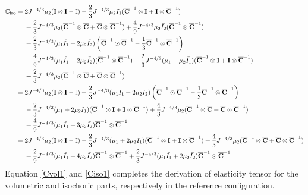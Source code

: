 \begin{equation} \label{Ciso1}
\begin{split}
\mathbb{C}_\mathrm{iso} 
= {} & 
2{J}^{-4/3}\mu_2(\bold{I} \otimes \bold{I} - \mathbb{I}) - \frac{2}{3}J^{-4/3}\mu_2\bar{I_1}({\overline{\bold{C}}}^{-1} \otimes \bold{I} + \bold{I} \otimes {\overline{\bold{C}}}^{-1}) \\
&+
\frac{2}{3}J^{-4/3}\mu_2({\overline{\bold{C}}}^{-1} \otimes {\overline{\bold{C}}} + {\overline{\bold{C}}} \otimes {\overline{\bold{C}}}^{-1}) + \frac{4}{9}J^{-4/3}\mu_2\bar{I_2}({\overline{\bold{C}}}^{-1} \otimes {\overline{\bold{C}}}^{-1}) \\
&+
\frac{2}{3}J^{-4/3}(\mu_1\bar{I_1} + 2\mu_2\bar{I_2}) \left ({\overline{\bold{C}}}^{-1} \odot {{\overline{\bold{C}}}}^{-1} - \frac{1}{3}{{\overline{\bold{C}}}}^{-1} \otimes {\overline{{\bold{C}}}}^{-1} \right) \\
&+
\frac{4}{9}J^{-4/3} (\mu_1\bar{I_1} + 2\mu_2\bar{I_2})({\overline{\bold{C}}}^{-1} \otimes {\overline{\bold{C}}}^{-1}) - \frac{2}{3}J^{-4/3}(\mu_1+\mu_2\bar{I_1})({\overline{\bold{C}}}^{-1} \otimes \bold{I} + \bold{I} \otimes {\overline{\bold{C}}}^{-1})\\
&+ \frac{2}{3}J^{-4/3}\mu_2({\overline{\bold{C}}}^{-1} \otimes {\overline{\bold{C}}}+{\overline{\bold{C}}} \otimes {\overline{\bold{C}}}^{-1})  \\
= {} &
2{J}^{-4/3}\mu_2(\bold{I} \otimes \bold{I} - \mathbb{I}) + \frac{2}{3}J^{-4/3}(\mu_1\bar{I_1} + 2\mu_2\bar{I_2})\left({\overline{\bold{C}}}^{-1} \odot {\overline{\bold{C}}}^{-1} - \frac{1}{3}{\overline{\bold{C}}}^{-1} \otimes {\overline{\bold{C}}}^{-1}\right) \\
&-
\frac{2}{3}J^{-4/3}(\mu_1 + 2\mu_2\bar{I_1})({\overline{\bold{C}}}^{-1} \otimes \bold{I} + \bold{I} \otimes {\overline{\bold{C}}}^{-1}) + \frac{4}{3}J^{-4/3}\mu_2({\overline{\bold{C}}}^{-1} \otimes {\overline{\bold{C}}} + {\overline{\bold{C}}} \otimes {\overline{\bold{C}}}^{-1}) \\
&+
\frac{4}{9}J^{-4/3}(\mu_1\bar{I_1} + 3\mu_2\bar{I_2}){\overline{\bold{C}}}^{-1} \otimes {\overline{\bold{C}}}^{-1} \\
= {} &
2{J}^{-4/3}\mu_2(\bold{I} \otimes \bold{I} - \mathbb{I}) - \frac{2}{3}J^{-4/3}(\mu_1 + 2\mu_2\bar{I_1})({\overline{\bold{C}}}^{-1} \otimes \bold{I} + \bold{I} \otimes {\overline{\bold{C}}}^{-1}) + \frac{4}{3}J^{-4/3}\mu_2({\overline{\bold{C}}}^{-1} \otimes {\overline{\bold{C}}} + {\overline{\bold{C}}} \otimes {\overline{\bold{C}}}^{-1}) \\
&+
\frac{2}{9}J^{-4/3}(\mu_1\bar{I_1} + 4\mu_2\bar{I_2}) {\overline{\bold{C}}}^{-1} \otimes {\overline{\bold{C}}}^{-1} + \frac{2}{3}J^{-4/3}(\mu_1\bar{I_1} + 2\mu_2\bar{I_2}){\overline{\bold{C}}}^{-1} \odot {\overline{\bold{C}}}^{-1} 
\end{split}
\end{equation} 
Equation \ref{Cvol1} and \ref{Ciso1} completes the derivation of elasticity tensor for the volumetric and isochoric parts, respectively in the reference configuration.

